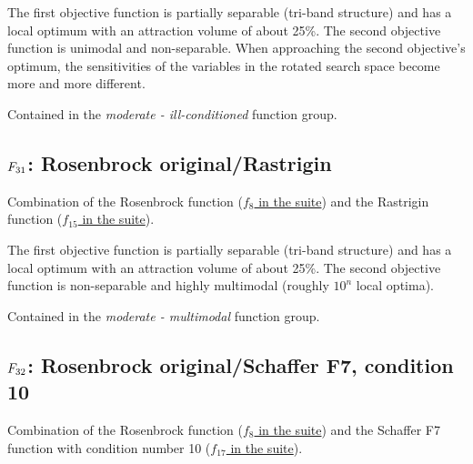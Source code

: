 The first objective function is partially separable (tri-band structure)
and has a local optimum with an attraction volume of about 25\%.
The second objective function is unimodal and non-separable. When
approaching the second objective's optimum, the sensitivities of the
variables in the rotated search space become more and more different.

Contained in the \emph{moderate - ill-conditioned} function group.



\subsection[\texorpdfstring{\protect\(F_{31}\protect\): Rosenbrock original/Rastrigin}{F31: Rosenbrock original/Rastrigin}]{\texorpdfstring{\protect\(F_{31}\protect\): Rosenbrock original/Rastrigin}{}}
\label{index:f31}\label{index:rosenbrock-original-rastrigin}
Combination of the Rosenbrock function (\href{https://coco.gforge.inria.fr/downloads/download16.00/bbobdocfunctions.pdf\#page=40}{\(f_8\) in the \bbob suite}) and the Rastrigin function
(\href{https://coco.gforge.inria.fr/downloads/download16.00/bbobdocfunctions.pdf\#page=75}{\(f_{15}\) in the \bbob suite}).

The first objective function is partially separable (tri-band structure)
and has a local optimum with an attraction volume of about 25\%.
The second objective function is non-separable and
highly multimodal (roughly \(10^n\) local
optima).

Contained in the \emph{moderate - multimodal} function group.



\subsection[\texorpdfstring{\protect\(F_{32}\protect\): Rosenbrock original/Schaffer F7, condition 10}{F32: Rosenbrock original/Schaffer F7, condition 10}]{\texorpdfstring{\protect\(F_{32}\protect\): Rosenbrock original/Schaffer F7, condition 10}{}}
\label{index:f32}\label{index:rosenbrock-original-schaffer-f7-condition-10}
Combination of the Rosenbrock function (\href{https://coco.gforge.inria.fr/downloads/download16.00/bbobdocfunctions.pdf\#page=40}{\(f_8\) in the \bbob suite}) and the
Schaffer F7 function with condition number 10
(\href{https://coco.gforge.inria.fr/downloads/download16.00/bbobdocfunctions.pdf\#page=85}{\(f_{17}\) in the \bbob suite}).

